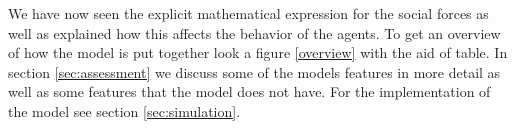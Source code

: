 We have now seen the explicit mathematical expression for the social forces 
as well as explained how this affects the behavior of the agents. To get an 
overview of how the model is put together look a figure \ref{overview} with 
the aid of table. In section \ref{sec:assessment} 
we discuss some of the models features in more detail as well as some features 
that the model does not have. For the implementation of the model see section \ref{sec:simulation}.
